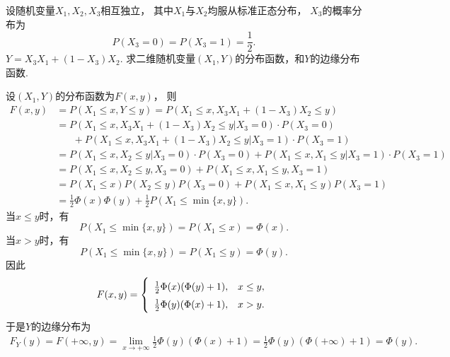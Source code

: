 \begin{example}
设随机变量\(X_1,X_2,X_3\)相互独立，
其中\(X_1\)与\(X_2\)均服从标准正态分布，
\(X_3\)的概率分布为\begin{equation*}
	P(X_3=0)
	= P(X_3=1)
	= \frac12.
\end{equation*}
\(Y = X_3 X_1 + (1 - X_3) X_2\).
求二维随机变量\((X_1,Y)\)的分布函数，和\(Y\)的边缘分布函数.
\begin{solution}
设\((X_1,Y)\)的分布函数为\(F(x,y)\)，
则\begin{align*}
	F(x,y) &= P(X_1 \leq x,Y \leq y)
	= P(X_1 \leq x,X_3 X_1 + (1 - X_3) X_2 \leq y) \\
	&= P(X_1 \leq x,X_3 X_1 + (1 - X_3) X_2 \leq y \vert X_3 = 0) \cdot P(X_3 = 0) \\
	&\hspace{20pt}+ P(X_1 \leq x,X_3 X_1 + (1 - X_3) X_2 \leq y \vert X_3 = 1) \cdot P(X_3 = 1) \\
	&= P(X_1 \leq x,X_2 \leq y \vert X_3 = 0) \cdot P(X_3 = 0)
	+ P(X_1 \leq x,X_1 \leq y \vert X_3 = 1) \cdot P(X_3 = 1) \\
	&= P(X_1 \leq x,X_2 \leq y,X_3 = 0)
	+ P(X_1 \leq x,X_1 \leq y,X_3 = 1) \\
	&= P(X_1 \leq x) P(X_2 \leq y) P(X_3 = 0)
	+ P(X_1 \leq x,X_1 \leq y) P(X_3 = 1) \\
	&= \frac12 \Phi(x) \Phi(y) + \frac12 P(X_1 \leq \min\{x,y\}).
\end{align*}
当\(x \leq y\)时，有\begin{equation*}
	P(X_1 \leq \min\{x,y\})
	= P(X_1 \leq x) = \Phi(x).
\end{equation*}
当\(x > y\)时，有\begin{equation*}
	P(X_1 \leq \min\{x,y\})
	= P(X_1 \leq y) = \Phi(y).
\end{equation*}
因此\begin{equation*}
	F(x,y)
	= \left\{ \def\arraystretch{1.5} \begin{array}{cl}
		\frac12 \Phi(x) (\Phi(y) + 1), & x \leq y, \\
		\frac12 \Phi(y) (\Phi(x) + 1), & x > y.
	\end{array} \right.
\end{equation*}
于是\(Y\)的边缘分布为\begin{align*}
	F_Y(y) = F(+\infty,y)
	= \lim_{x\to+\infty} \frac12 \Phi(y) (\Phi(x) + 1)
	= \frac12 \Phi(y) (\Phi(+\infty) + 1)
	= \Phi(y).
\end{align*}
\end{solution}
\end{example}

